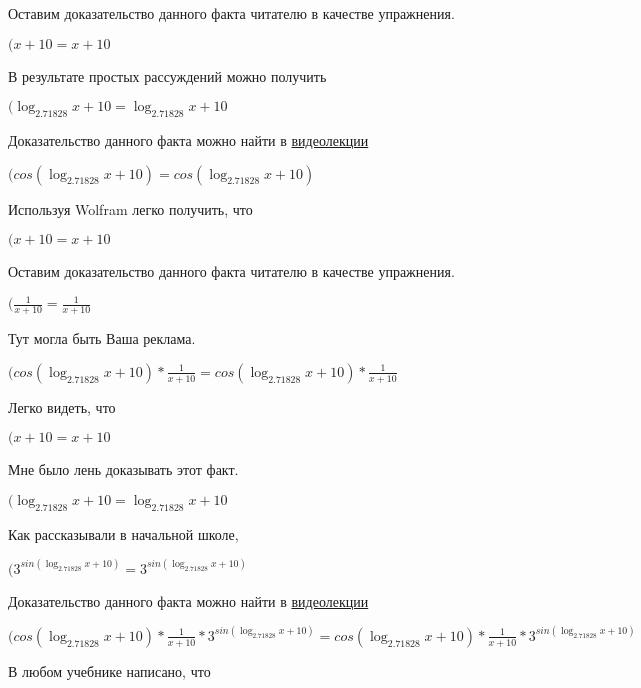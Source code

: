 \documentclass[12pt,a4paper,fleqn]{article}
\theoremstyle{definition}
\begin{document}
Оставим доказательство данного факта читателю в качестве упражнения.

$( x  +  10  =  x  +  10 $

В результате простых рассуждений можно получить

$(\log_{ 2.71828 }{ x  +  10 } = \log_{ 2.71828 }{ x  +  10 }$

Доказательство данного факта можно найти в \href{https://www.youtube.com/watch?v=dQw4w9WgXcQ}{видеолекции}

$(cos(\log_{ 2.71828 }{ x  +  10 }) = cos(\log_{ 2.71828 }{ x  +  10 })$

Используя Wolfram легко получить, что

$( x  +  10  =  x  +  10 $

Оставим доказательство данного факта читателю в качестве упражнения.

$(\frac{ 1 }{ x  +  10 }
 = \frac{ 1 }{ x  +  10 }
$

Тут могла быть Ваша реклама.

$(cos(\log_{ 2.71828 }{ x  +  10 }) * \frac{ 1 }{ x  +  10 }
 = cos(\log_{ 2.71828 }{ x  +  10 }) * \frac{ 1 }{ x  +  10 }
$

Легко видеть, что

$( x  +  10  =  x  +  10 $

Мне было лень доказывать этот факт.

$(\log_{ 2.71828 }{ x  +  10 } = \log_{ 2.71828 }{ x  +  10 }$

Как рассказывали в начальной школе,

$({ 3 }^{sin(\log_{ 2.71828 }{ x  +  10 })} = { 3 }^{sin(\log_{ 2.71828 }{ x  +  10 })}$

Доказательство данного факта можно найти в \href{https://www.youtube.com/watch?v=dQw4w9WgXcQ}{видеолекции}

$(cos(\log_{ 2.71828 }{ x  +  10 }) * \frac{ 1 }{ x  +  10 }
 * { 3 }^{sin(\log_{ 2.71828 }{ x  +  10 })} = cos(\log_{ 2.71828 }{ x  +  10 }) * \frac{ 1 }{ x  +  10 }
 * { 3 }^{sin(\log_{ 2.71828 }{ x  +  10 })}$

В любом учебнике написано, что
\end{document}
